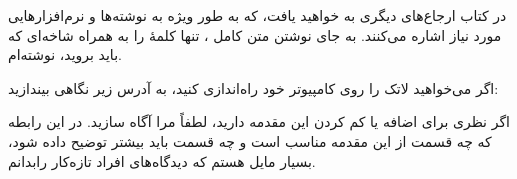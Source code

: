 در کتاب ارجاع‌های دیگری به 
خواهید یافت، که به طور ویژه به نوشته‌ها و نرم‌افزارهایی مورد نیاز اشاره می‌کنند. به جای نوشتن متن کامل 
،
تنها کلمهٔ 
را به همراه شاخه‌ای که باید بروید، نوشته‌ام.

اگر می‌خواهید لاتک را روی کامپیوتر خود راه‌اندازی کنید، به آدرس زیر نگاهی بیندازید:

\setRL


\noindent 
اگر نظری برای اضافه یا کم کردن این مقدمه دارید، لطفاً مرا آگاه سازید.  در این رابطه که چه قسمت از این مقدمه مناسب است و چه قسمت باید بیشتر توضیح داده شود، بسیار مایل هستم که دیدگاه‌های افراد تازه‌کار رابدانم.

\bigskip

\begin{latin}
\begin{verse}
%
\end{verse}
\end{latin}


%

